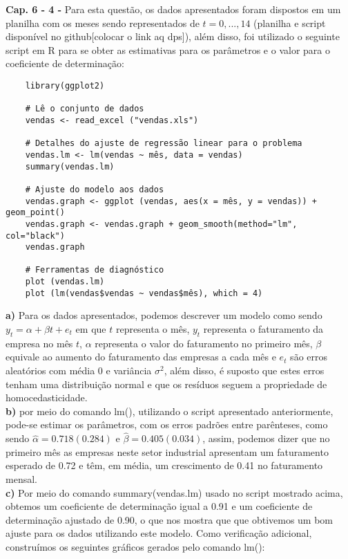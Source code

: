 \documentclass[10pt,a4paper]{article}
\begin{document}
\textbf{Cap. 6 - 4 - } Para esta questão, os dados apresentados foram dispostos em um planilha com os meses sendo representados de $t = 0,...,14$ (planilha e script disponível no github[colocar o link aq dps]), além disso, foi utilizado o seguinte script em R para se obter as estimativas para os parâmetros e o valor para o coeficiente de determinação: \\

\begin{lstlisting}
	library(ggplot2)

	# Lê o conjunto de dados
	vendas <- read_excel ("vendas.xls")

	# Detalhes do ajuste de regressão linear para o problema
	vendas.lm <- lm(vendas ~ mês, data = vendas)
	summary(vendas.lm)
	
	# Ajuste do modelo aos dados 
	vendas.graph <- ggplot (vendas, aes(x = mês, y = vendas)) + geom_point()
	vendas.graph <- vendas.graph + geom_smooth(method="lm", col="black")
	vendas.graph
	
	# Ferramentas de diagnóstico
	plot (vendas.lm)
	plot (lm(vendas$vendas ~ vendas$mês), which = 4)
\end{lstlisting}

\textbf{a)} Para os dados apresentados, podemos descrever um modelo como sendo $y_t = \alpha + \beta t + e_t$ em que $t$ representa o mês, $y_t$ representa o faturamento da empresa no mês $t$, $\alpha$ representa o valor do faturamento no primeiro mês, $\beta$ equivale ao aumento do faturamento das empresas a cada mês e $e_t$ são erros aleatórios com média 0 e variância $\sigma^2$, além disso, é suposto que estes erros tenham uma distribuição normal e que os resíduos seguem a propriedade de  homocedasticidade. \\

\textbf{b)} por meio do comando lm(), utilizando o script apresentado anteriormente, pode-se estimar os parâmetros, com os erros padrões entre parênteses, como sendo $\hat{\alpha} = 0.718(0.284)$ e $\hat{\beta} = 0.405(0.034)$, assim, podemos dizer que no primeiro mês as empresas neste setor industrial apresentam um faturamento esperado de 0.72 e têm, em média, um crescimento de 0.41 no faturamento mensal. \\

\textbf{c)} Por meio do comando summary(vendas.lm) usado no script mostrado acima, obtemos um coeficiente de determinação igual a 0.91 e um coeficiente de determinação ajustado de 0.90, o que nos mostra que que obtivemos um bom ajuste para os dados utilizando este modelo. Como verificação adicional, construímos os seguintes gráficos gerados pelo comando lm():
\end{document}
